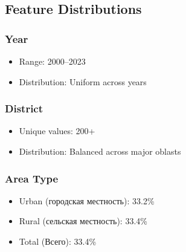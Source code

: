 \subsection{Feature Distributions}
\subsubsection{Year}
\begin{itemize}
    \item Range: 2000--2023
    \item Distribution: Uniform across years
\end{itemize}

\subsubsection{District}
\begin{itemize}
    \item Unique values: 200+
    \item Distribution: Balanced across major oblasts
\end{itemize}

\subsubsection{Area Type}
\begin{itemize}
    \item Urban (городская местность): 33.2\%
    \item Rural (сельская местность): 33.4\%
    \item Total (Всего): 33.4\%
\end{itemize}
